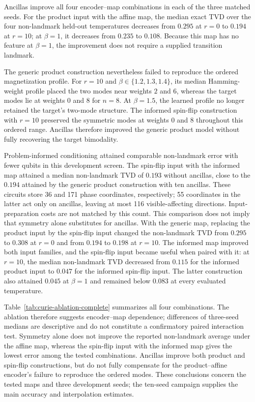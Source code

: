 \documentclass[pra,aps,10pt,twocolumn,floatfix,superscriptaddress,
notitlepage,longbibliography]{revtex4-2}
\begin{document}
Ancillas improve all four encoder--map combinations in each of the three matched seeds. For the product input with the affine map, the median exact TVD over the four non-landmark held-out temperatures decreases from $0.295$ at $r=0$ to $0.194$ at $r=10$; at $\beta=1$, it decreases from $0.235$ to $0.108$. Because this map has no feature at $\beta=1$, the improvement does not require a supplied transition landmark.

The generic product construction nevertheless failed to reproduce the ordered magnetization profile. For $r=10$ and $\beta\in\{1.2,1.3,1.4\}$, its median Hamming-weight profile placed the two modes near weights $2$ and $6$, whereas the target modes lie at weights $0$ and $8$ for $n=8$. At $\beta=1.5$, the learned profile no longer retained the target's two-mode structure. The informed spin-flip construction with $r=10$ preserved the symmetric modes at weights $0$ and $8$ throughout this ordered range. Ancillas therefore improved the generic product model without fully recovering the target bimodality.

Problem-informed conditioning attained comparable non-landmark error with fewer qubits in this development screen. The spin-flip input with the informed map attained a median non-landmark TVD of $0.193$ without ancillas, close to the $0.194$ attained by the generic product construction with ten ancillas. These circuits store 36 and 171 phase coordinates, respectively; 55 coordinates in the latter act only on ancillas, leaving at most 116 visible-affecting directions. Input-preparation costs are not matched by this count. This comparison does not imply that symmetry alone substitutes for ancillas. With the generic map, replacing the product input by the spin-flip input changed the non-landmark TVD from $0.295$ to $0.308$ at $r=0$ and from $0.194$ to $0.198$ at $r=10$. The informed map improved both input families, and the spin-flip input became useful when paired with it: at $r=10$, the median non-landmark TVD decreased from $0.115$ for the informed product input to $0.047$ for the informed spin-flip input. The latter construction also attained $0.045$ at $\beta=1$ and remained below $0.083$ at every evaluated temperature.

Table~\ref{tab:curie-ablation-complete} summarizes all four combinations. The ablation therefore suggests encoder--map dependence; differences of three-seed medians are descriptive and do not constitute a confirmatory paired interaction test. Symmetry alone does not improve the reported non-landmark average under the affine map, whereas the spin-flip input with the informed map gives the lowest error among the tested combinations. Ancillas improve both product and spin-flip constructions, but do not fully compensate for the product--affine encoder's failure to reproduce the ordered modes. These conclusions concern the tested maps and three development seeds; the ten-seed campaign supplies the main accuracy and interpolation estimates.
\end{document}
